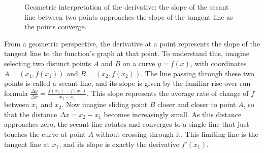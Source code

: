 \begin{figure}[htbp]
\centering
{}
\caption{Geometric interpretation of the derivative: the slope of the secant line between two points approaches the slope of the tangent line as the points converge.}
\end{figure}

From a geometric perspective, the derivative at a point represents the slope of the tangent line to the function's graph at that point. To understand this, imagine selecting two distinct points $A$ and $B$ on a curve $y = f(x)$, with coordinates $A = (x_1, f(x_1))$ and $B = (x_2, f(x_2))$. The line passing through these two points is called a secant line, and its slope is given by the familiar rise-over-run formula $\frac{\Delta y}{\Delta x} = \frac{f(x_2) - f(x_1)}{x_2 - x_1}$. This slope represents the average rate of change of $f$ between $x_1$ and $x_2$. Now imagine sliding point $B$ closer and closer to point $A$, so that the distance $\Delta x = x_2 - x_1$ becomes increasingly small. As this distance approaches zero, the secant line rotates and converges to a single line that just touches the curve at point $A$ without crossing through it. This limiting line is the tangent line at $x_1$, and its slope is exactly the derivative $f'(x_1)$.

